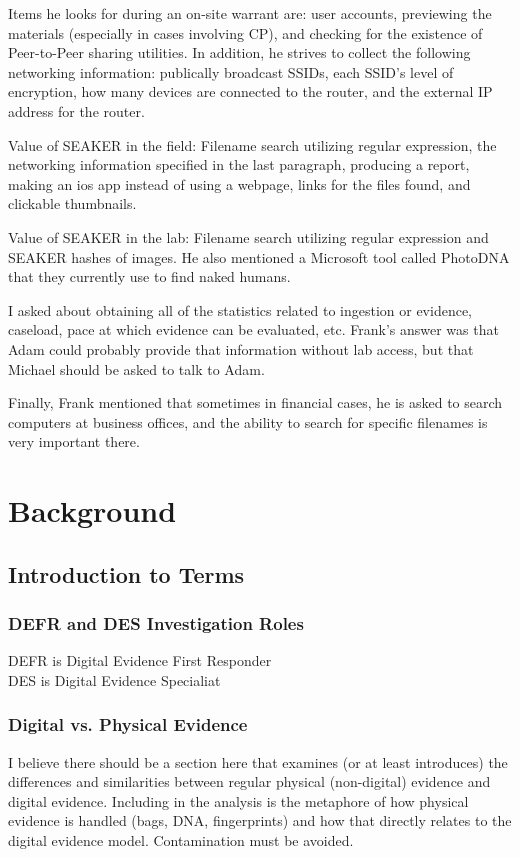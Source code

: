 \documentclass[12pt]{article}
\begin{document}
Items he looks for during an on-site warrant are: user accounts, previewing the materials (especially in
cases involving CP), and checking for the existence of Peer-to-Peer sharing utilities.  In addition, he 
strives to collect the following networking information: publically broadcast SSIDs, each SSID's level of
encryption, how many devices are connected to the router, and the external IP address for the router.

Value of SEAKER in the field: Filename search utilizing regular expression, the networking information 
specified in the last paragraph, producing a report, making an ios app instead of using a webpage, links
for the files found, and clickable thumbnails.

Value of SEAKER in the lab: Filename search utilizing regular expression and SEAKER hashes of images.  He
also mentioned a Microsoft tool called PhotoDNA that they currently use to find naked humans.

I asked about obtaining all of the statistics related to ingestion or evidence, caseload, pace at which
evidence can be evaluated, etc.  Frank's answer was that Adam could probably provide that information
without lab access, but that Michael should be asked to talk to Adam.

Finally, Frank mentioned that sometimes in financial cases, he is asked to search computers at business
offices, and the ability to search for specific filenames is very important there.

\newpage
\section{Background}
\label{sect-background}

\subsection{Introduction to Terms}
\vspace{0.5 cm}
\subsubsection{DEFR and DES Investigation Roles}
\vspace{0.5 cm}
DEFR is Digital Evidence First Responder\\

DES is Digital Evidence Specialiat\\

\subsubsection{Digital vs. Physical Evidence}
\vspace{0.5 cm}
I believe there should be a section here that examines (or at least introduces) the differences and similarities
between regular physical (non-digital) evidence and digital evidence.  Including in the analysis is the metaphore of
how physical evidence is handled (bags, DNA, fingerprints) and how that directly relates to the digital evidence
model.  Contamination must be avoided.\\
\end{document}
